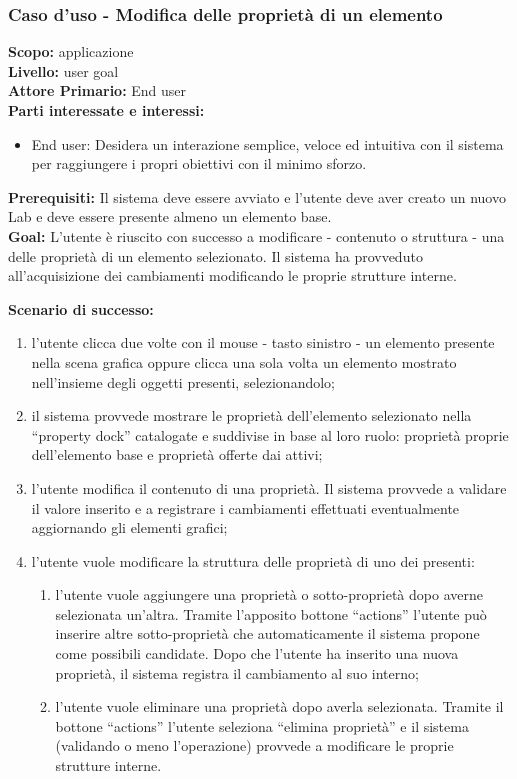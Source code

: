 \begin{flushleft}
\begin{boxedminipage}{\textwidth}

\subsubsection*{Caso d'uso - Modifica delle proprietà di un elemento}

\textbf{Scopo:} applicazione \visualnetkit{} \\
\textbf{Livello:} user goal \\
\textbf{Attore Primario:} End user \\
\textbf{Parti interessate e interessi:}
\begin{itemize}
\item End user: Desidera un interazione semplice, veloce ed intuitiva con il sistema per raggiungere i propri obiettivi con il minimo sforzo.
\end{itemize}

\textbf{Prerequisiti:} Il sistema deve essere avviato e l'utente deve aver creato un nuovo Lab e deve essere presente almeno un elemento base. \\
\textbf{Goal:} L'utente è riuscito con successo a modificare - contenuto o struttura - una delle proprietà di un elemento selezionato. Il sistema ha provveduto all'acquisizione dei cambiamenti modificando le proprie strutture interne.

\textbf{Scenario di successo:}
\begin{enumerate}
\item l'utente clicca due volte con il mouse - tasto sinistro - un elemento presente nella scena grafica oppure clicca una sola volta un elemento mostrato nell'insieme degli oggetti presenti, selezionandolo;
\item il sistema provvede mostrare le proprietà dell'elemento selezionato nella ``property dock'' catalogate e suddivise in base al loro ruolo: proprietà proprie dell'elemento base e proprietà offerte dai \plugin{} attivi;
\item l'utente modifica il contenuto di una proprietà. Il sistema provvede a validare il valore inserito e a registrare i cambiamenti effettuati eventualmente aggiornando gli elementi grafici;
\item l'utente vuole modificare la struttura delle proprietà di uno dei \plugin{} presenti:
	\begin{enumerate}
	\item l'utente vuole aggiungere una proprietà o sotto-proprietà dopo averne selezionata un'altra. Tramite l'apposito bottone ``actions'' l'utente può inserire altre sotto-proprietà che automaticamente il sistema propone come possibili candidate. Dopo che l'utente ha inserito una nuova proprietà, il sistema registra il cambiamento al suo interno;
	\item l'utente vuole eliminare una proprietà dopo averla selezionata. Tramite il bottone ``actions'' l'utente seleziona ``elimina proprietà'' e il sistema (validando o meno l'operazione) provvede a modificare le proprie strutture interne.
	\end{enumerate}
\end{enumerate}


\end{boxedminipage}
\end{flushleft}
